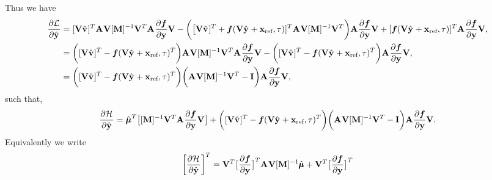 \documentclass[3p,computermodern,10pt]{elsarticle}
\begin{document}
\begin{appendices}
$$$$
Thus we have
\begin{align*}
\frac{\partial \mathcal{L}^{}}{\partial \hat{\mathbf{y}}^{}} &= 
[\mathbf {V} \hat{\mathbf{v}}^{} ]^T   \mathbf{A}^{}   \mathbf {V}  [\mathbf{M}]^{-1}\mathbf {V}^T
\mathbf{A}^{} \frac{\partial \boldsymbol f}{\partial \mathbf{y}} \mathbf {V} -
\bigg( \big[ \mathbf {V} \hat{\mathbf{v}}^{} ]^T  + \boldsymbol f(\mathbf {V} \hat{\mathbf{y}}^{} + \mathbf{x}_\text{ref},\tau)]^T  \mathbf{A}^{} \mathbf {V} [\mathbf{M}]^{-1} \mathbf {V}^T  \bigg) \mathbf{A}^{} \frac{\partial \boldsymbol f}{\partial \mathbf{y}} \mathbf {V} + 
 [\boldsymbol f(\mathbf {V} \hat{\mathbf{y}}^{} + \mathbf{x}_\text{ref},\tau) ]^T  \mathbf{A}^{} \frac{\partial \boldsymbol f}{\partial \mathbf{y}} \mathbf {V}, \\
&= 
\bigg( [\mathbf {V} \hat{\mathbf{v}}^{} ]^T - \boldsymbol f(\mathbf {V} \hat{\mathbf{y}}^{} + \mathbf{x}_\text{ref},\tau)^T \bigg)  \mathbf{A}^{}   \mathbf {V}  [\mathbf{M}]^{-1}\mathbf {V}^T
\mathbf{A}^{} \frac{\partial \boldsymbol f}{\partial \mathbf{y}} \mathbf {V} -
\bigg( [\mathbf {V} \hat{\mathbf{v}}^{} ]^T - \boldsymbol f(\mathbf {V} \hat{\mathbf{y}}^{} + \mathbf{x}_\text{ref},\tau)^T \bigg)  \mathbf{A}^{}
\frac{\partial \boldsymbol f}{\partial \mathbf{y}} \mathbf {V}, \\ 
&= 
\bigg( [\mathbf {V} \hat{\mathbf{v}}^{} ]^T - \boldsymbol f(\mathbf {V} \hat{\mathbf{y}}^{} + \mathbf{x}_\text{ref},\tau)^T \bigg)   \bigg( \mathbf{A}^{} \mathbf {V}  [\mathbf{M}]^{-1}\mathbf {V}^T - \mathbf{I} \bigg)
\mathbf{A}^{} \frac{\partial \boldsymbol f}{\partial \mathbf{y}} \mathbf {V}, 
\end{align*}
such that,
\begin{equation*}
\frac{\partial \mathcal{H}^{}}{\partial \hat{\mathbf{y}}^{}{}} = 
  \hat{\boldsymbol \mu}^{T} \big[  [\mathbf{M}]^{-1}\mathbf {V}^T \mathbf{A}^{}  \frac{\partial \boldsymbol f}{\partial \mathbf{y}}\mathbf {V}  \big]  + 
\bigg( [\mathbf {V} \hat{\mathbf{v}}^{} ]^T - \boldsymbol f(\mathbf {V} \hat{\mathbf{y}}^{} + \mathbf{x}_\text{ref},\tau)^T \bigg)   \bigg( \mathbf{A}^{} \mathbf {V}  [\mathbf{M}]^{-1}\mathbf {V}^T - \mathbf{I} \bigg)
\mathbf{A}^{} \frac{\partial \boldsymbol f}{\partial \mathbf{y}} \mathbf {V}.
\end{equation*}
Equivalently we write
\begin{equation*}
\bigg[ \frac{\partial \hamiltonianArg{}}{\partial \genstateyDiscreteArgnt{}{}} \bigg]^T =  \basisspace^T \big[  \frac{\partial \velocity}{\partial \stateyDiscrete} \big]^T \stweightingMatArg{}  \basisspace [\massArgnt{}]^{-1}  \adjointDiscreteDumArgnt{} + 
 \basisspace^T \big[  \frac{\partial \velocity}{\partial \stateyDiscrete} \big]^T 

\end{equation*}
\end{appendices}
\end{document}

